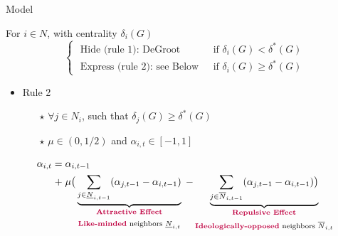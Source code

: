 \documentclass[xcolor=table]{beamer}
\begin{document}
\begin{frame}{Model}
		
				\begin{tcolorbox}[enhanced,attach boxed title to top center={yshift=-3mm,yshifttext=-1mm}, colback=red!3,colframe=red!40,colbacktitle=red!40 ,fonttitle=\bfseries, boxed title style={size=small,colframe=red!50}, title ={Opinion Updating} ]  For $i \in N$, with centrality $\delta_i (G)$
\begin{equation*} 
	\begin{cases}
		 \text{ Hide (rule 1): DeGroot } & \text{ if } \delta_i (G) < \delta^{*} (G) \\
		\text{ Express (rule 2): see Below } & \text{ if } \delta_i (G) \geq \delta^{*} (G)
	\end{cases}
\end{equation*} 
	\end{tcolorbox}
	
	\begin{itemize}
		\item Rule 2 \begin{itemize} \item[$\star$] $\forall j \in N_i$, such that $ \delta_j(G) \geq \delta^{*} (G)$ \item[$\star$] {$\mu \in (0,1/2)$} and {\bf\color{purple}$\alpha_{i,t} \in [-1,1]$} \end{itemize} 
	\end{itemize}
 	\begin{equation*}
	\begin{split}
	 \alpha_{i,{t}}  =  & \; \alpha_{i,{t-1}} \\  +   & \; \mu \big( \underbrace{\sum_{j \in \underline{N}_{i,t-1}}   (  \alpha_{j,t-1} - \alpha_{i,t-1} )}_{\substack{\text{{\bf\color{purple}Attractive Effect}} \\ \\ \text{{\bf\color{purple}Like-minded} neighbors } \underline{N}_{i,t}}} \; - \underbrace{\sum_{j \in \overline{N}_{i,t-1}} ( \alpha_{j,t-1} - \alpha_{i,t-1} ) \big)}_{\substack{\text{{\bf\color{purple}Repulsive Effect}} \\ \\ \text{{\bf\color{purple}Ideologically-opposed} neighbors } \overline{N}_{i,t}}}    \label{lawofmotion}
	 \end{split}
 	\end{equation*}



\end{frame}
\end{document}
